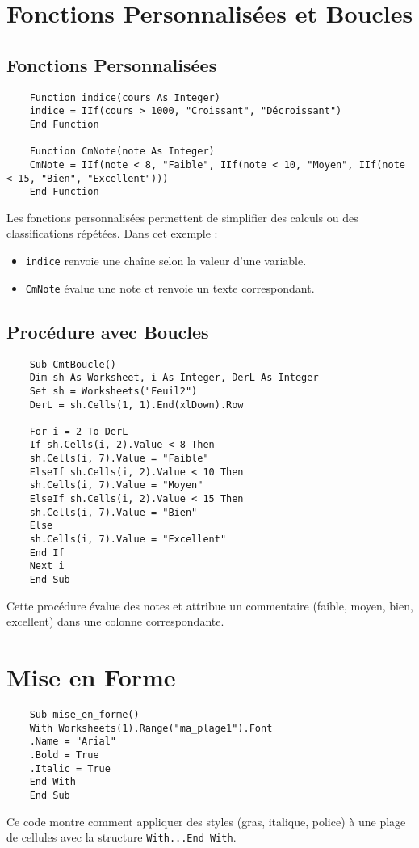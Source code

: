 \documentclass[a4paper,12pt]{report}
\begin{document}
\chapter{Fonctions Personnalisées et Boucles}

\section{Fonctions Personnalisées}
\begin{lstlisting}
	Function indice(cours As Integer)
	indice = IIf(cours > 1000, "Croissant", "Décroissant")
	End Function
	
	Function CmNote(note As Integer)
	CmNote = IIf(note < 8, "Faible", IIf(note < 10, "Moyen", IIf(note < 15, "Bien", "Excellent")))
	End Function
\end{lstlisting}

Les fonctions personnalisées permettent de simplifier des calculs ou des classifications répétées. Dans cet exemple :
\begin{itemize}
	\item \texttt{indice} renvoie une chaîne selon la valeur d'une variable.
	\item \texttt{CmNote} évalue une note et renvoie un texte correspondant.
	
\end{itemize}
\newpage
\section{Procédure avec Boucles}
\begin{lstlisting}
	Sub CmtBoucle()
	Dim sh As Worksheet, i As Integer, DerL As Integer
	Set sh = Worksheets("Feuil2")
	DerL = sh.Cells(1, 1).End(xlDown).Row
	
	For i = 2 To DerL
	If sh.Cells(i, 2).Value < 8 Then
	sh.Cells(i, 7).Value = "Faible"
	ElseIf sh.Cells(i, 2).Value < 10 Then
	sh.Cells(i, 7).Value = "Moyen"
	ElseIf sh.Cells(i, 2).Value < 15 Then
	sh.Cells(i, 7).Value = "Bien"
	Else
	sh.Cells(i, 7).Value = "Excellent"
	End If
	Next i
	End Sub
\end{lstlisting}

Cette procédure évalue des notes et attribue un commentaire (faible, moyen, bien, excellent) dans une colonne correspondante.

\chapter{Mise en Forme}

\begin{lstlisting}
	Sub mise_en_forme()
	With Worksheets(1).Range("ma_plage1").Font
	.Name = "Arial"
	.Bold = True
	.Italic = True
	End With
	End Sub
\end{lstlisting}

Ce code montre comment appliquer des styles (gras, italique, police) à une plage de cellules avec la structure \texttt{With...End With}.
\end{document}
